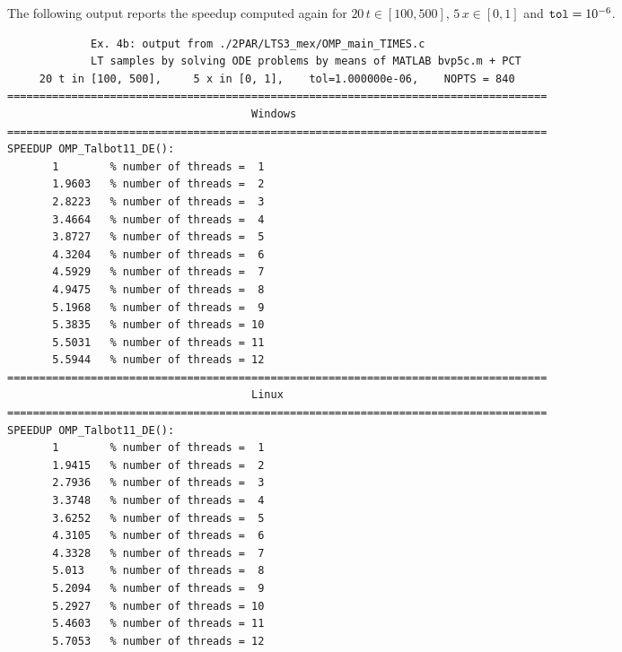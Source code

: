\documentclass[a4paper,10pt]{report}%
\begin{document}
\noindent The following output reports the speedup computed again for $20\,t\in[100,500]$, $5\,x\in[0,1]$
and ${\tt tol}=10^{-6}$.
\begin{lstlisting}
             Ex. 4b: output from ./2PAR/LTS3_mex/OMP_main_TIMES.c
             LT samples by solving ODE problems by means of MATLAB bvp5c.m + PCT
     20 t in [100, 500],     5 x in [0, 1],    tol=1.000000e-06,    NOPTS = 840
====================================================================================
                                      Windows
====================================================================================
SPEEDUP OMP_Talbot11_DE():
       1        % number of threads =  1
       1.9603   % number of threads =  2
       2.8223   % number of threads =  3
       3.4664   % number of threads =  4
       3.8727   % number of threads =  5
       4.3204   % number of threads =  6
       4.5929   % number of threads =  7
       4.9475   % number of threads =  8
       5.1968   % number of threads =  9
       5.3835   % number of threads = 10
       5.5031   % number of threads = 11
       5.5944   % number of threads = 12
====================================================================================
                                      Linux
====================================================================================
SPEEDUP OMP_Talbot11_DE():
       1        % number of threads =  1
       1.9415   % number of threads =  2
       2.7936   % number of threads =  3
       3.3748   % number of threads =  4
       3.6252   % number of threads =  5
       4.3105   % number of threads =  6
       4.3328   % number of threads =  7
       5.013    % number of threads =  8
       5.2094   % number of threads =  9
       5.2927   % number of threads = 10
       5.4603   % number of threads = 11
       5.7053   % number of threads = 12


\end{lstlisting}
\end{document}
